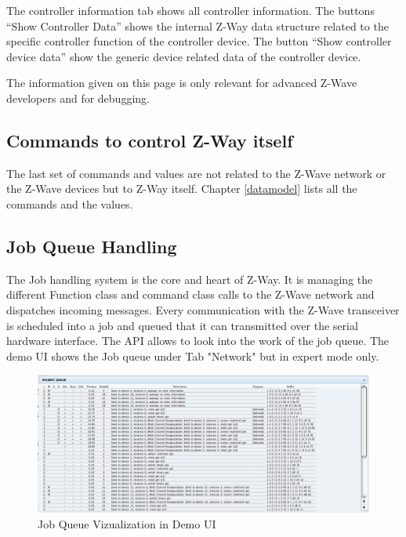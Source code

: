 The controller information tab shows all controller information. The buttons “Show Controller Data” shows the 
internal Z-Way data structure related to the specific controller function of the controller device. The button 
“Show controller device data” show the generic device related data of the controller device.

The information given on this page is only relevant for advanced Z-Wave developers and for debugging.

\subsection{Commands to control Z-Way itself} 
 
The last set of commands and values are not related to the Z-Wave network or the Z-Wave devices but to Z-Way itself.  
Chapter \ref{datamodel} lists all the commands and the values.

\subsection{Job Queue Handling}

The Job handling system is the core and heart of Z-Way. It is managing the different Function class and command class calls 
to the Z-Wave network and dispatches incoming messages. Every communication with the Z-Wave transceiver is scheduled 
into a job and queued that it can transmitted over the serial hardware interface. The API allows to look into the work of the job queue. 
The demo UI shows the Job queue under Tab "Network" but in expert  mode only.

\begin{figure} 
\begin{center}
\includegraphics[scale=0.9]{pics/jobqueue.png}
\caption{Job Queue Vizualization in Demo UI}
\end{center} 
\end{figure}

